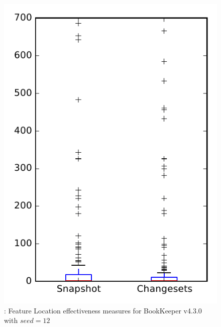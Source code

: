 
\begin{figure}
\centering
\includegraphics[height=0.4\textheight]{figures/flt_seed/rq1_bookkeeper_12}
\caption{\rone: Feature Location effectiveness measures for BookKeeper v4.3.0 with $seed=12$}
\label{fig:flt_seed:rq1:bookkeeper}
\end{figure}
